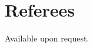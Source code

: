 \documentclass[11pt,a4paper,sans]{moderncv} %
\begin{document}



%

%



\section{Referees}
\qquad \qquad \qquad \qquad \qquad Available upon request.
\end{document}
